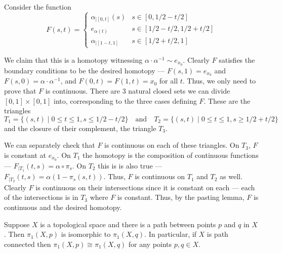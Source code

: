 \documentclass[12 pt, letterpaper]{hmcpset}
\begin{document}
\begin{solution}
	Consider the function
	\[
		F(s, t) = \begin{cases}
			\alpha_{\mid [0, t]}(s) & s \in [0, 1/2 - t/2] \\
			e_{\alpha(t)} & s \in [1/2 - t/2, 1/2 + t/2] \\
			\alpha_{\mid [1 - t, 1]} & s \in [1/2 + t/2, 1]
		\end{cases}
	\]

	We claim that this is a homotopy witnessing $\alpha \cdot \alpha^{-1} \sim e_{x_{0}}$. Clearly $F$ satisfies the boundary conditions to be the desired homotopy --- $F(s, 1) = e_{x_{0}}$ and $F(s, 0) = \alpha \cdot \alpha^{-1}$, and $F(0, t) = F(1, t) = x_{0}$ for all $t$. Thus, we only need to prove that $F$ is continuous. There are 3 natural closed sets we can divide  $[0, 1] \times [0, 1]$ into, corresponding to the three cases defining $F$. These are the triangles
	\[
		T_{1} = \{ (s, t) \mid 0 \le t \le 1, s \le 1/2 - t/2 \} \quad \text{and} \quad T_{2} = \{ (s, t) \mid 0 \le t \le 1, s \ge 1/2 + t/2 \}
	\]
	and the closure of their complement, the triangle $T_{3}$.

	We can separately check that $F$ is continuous on each of these triangles. On $T_{3}$, $F$ is constant at $e_{x_{0}}$. On $T_{1}$ the homotopy is the composition of continuous functions --- $F_{\mid T_{1}}(t, s) = \alpha \circ \pi_{s}$. On $T_{2}$ this is is also true --- $F_{\mid T_{2}}(t, s) = \alpha(1 - \pi_{s}(s, t))$. Thus, $F$ is continuous on $T_{1}$ and $T_{2}$ as well. Clearly $F$ is continuous on their intersections since it is constant on each --- each of the intersections is in $T_{3}$ where $F$ is constant. Thus, by the pasting lemma, $F$ is continuous and the desired homotopy.
\end{solution}

\pagebreak

\begin{problem}[12.10]
	Suppose $X$ is a topological space and there is a path between points $p$ and $q$ in $X$. Then $\pi_{1}(X, p)$ is isomorphic to $\pi_{1}(X, q)$. In particular, if $X$ is path connected then $\pi_{1}(X, p) \cong \pi_{1}(X, q)$ for any points $p, q \in X$.
\end{problem}
\end{document}
